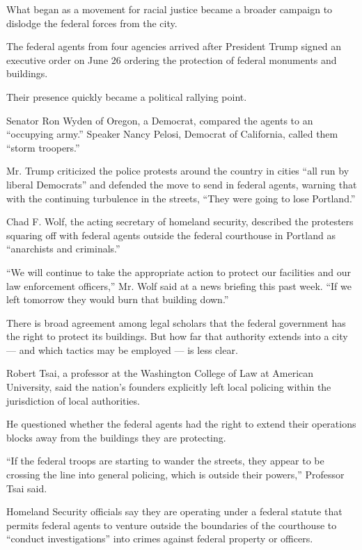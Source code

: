 What began as a movement for racial justice became a broader campaign to
dislodge the federal forces from the city.

The federal agents from four agencies arrived after President Trump
signed an executive order on June 26 ordering the protection of federal
monuments and buildings.

Their presence quickly became a political rallying point.

Senator Ron Wyden of Oregon, a Democrat, compared the agents to an
``occupying army.'' Speaker Nancy Pelosi, Democrat of California, called
them ``storm troopers.''

Mr. Trump criticized the police protests around the country in cities
``all run by liberal Democrats'' and defended the move to send in
federal agents, warning that with the continuing turbulence in the
streets, ``They were going to lose Portland.''

Chad F. Wolf, the acting secretary of homeland security, described the
protesters squaring off with federal agents outside the federal
courthouse in Portland as ``anarchists and criminals.''

``We will continue to take the appropriate action to protect our
facilities and our law enforcement officers,'' Mr. Wolf said at a news
briefing this past week. ``If we left tomorrow they would burn that
building down.''

There is broad agreement among legal scholars that the federal
government has the right to protect its buildings. But how far that
authority extends into a city --- and which tactics may be employed ---
is less clear.

Robert Tsai, a professor at the Washington College of Law at American
University, said the nation's founders explicitly left local policing
within the jurisdiction of local authorities.

He questioned whether the federal agents had the right to extend their
operations blocks away from the buildings they are protecting.

``If the federal troops are starting to wander the streets, they appear
to be crossing the line into general policing, which is outside their
powers,'' Professor Tsai said.

Homeland Security officials say they are operating under a federal
statute that permits federal agents to venture outside the boundaries of
the courthouse to ``conduct investigations'' into crimes against federal
property or officers.

